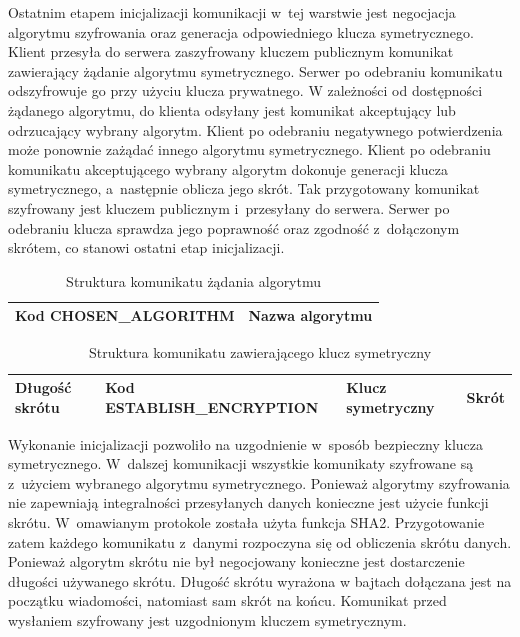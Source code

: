 Ostatnim etapem inicjalizacji komunikacji w~tej warstwie jest
negocjacja algorytmu szyfrowania oraz generacja odpowiedniego klucza
symetrycznego. Klient przesyła do serwera zaszyfrowany kluczem
publicznym komunikat zawierający żądanie algorytmu
symetrycznego. Serwer po odebraniu komunikatu odszyfrowuje go przy
użyciu klucza prywatnego. W zależności od dostępności żądanego
algorytmu, do klienta odsyłany jest komunikat akceptujący lub
odrzucający wybrany algorytm. Klient po odebraniu negatywnego
potwierdzenia może ponownie zażądać innego algorytmu
symetrycznego. Klient po odebraniu komunikatu akceptującego wybrany
algorytm dokonuje generacji klucza symetrycznego, a~następnie oblicza
jego skrót. Tak przygotowany komunikat szyfrowany jest kluczem
publicznym i~przesyłany do serwera. Serwer po odebraniu klucza
sprawdza jego poprawność oraz zgodność z~dołączonym skrótem, co
stanowi ostatni etap inicjalizacji.

\begin{table}[H]
\centering
\caption{Struktura komunikatu żądania algorytmu }

\begin{tabular}{|p{5cm}|p{6cm}|}
\hline
\raggedright{Kod CHOSEN\_ALGORITHM} & Nazwa algorytmu\\
\hline
\end{tabular}
\end{table}

\begin{table}[H]
\centering
\caption{Struktura komunikatu zawierającego klucz symetryczny}

\begin{tabular}{|p{3cm}|p{5cm}|p{3cm}|p{2cm}|}
\hline
Długość skrótu & \raggedright{Kod ESTABLISH\_ENCRYPTION} & \raggedright{Klucz symetryczny} & Skrót \\
\hline
\end{tabular}
\end{table}

Wykonanie inicjalizacji pozwoliło na uzgodnienie w~sposób bezpieczny
klucza symetrycznego. W~dalszej komunikacji wszystkie komunikaty
szyfrowane są z~użyciem wybranego algorytmu symetrycznego. Ponieważ
algorytmy szyfrowania nie zapewniają integralności przesyłanych danych
konieczne jest użycie funkcji skrótu. W~omawianym protokole została
użyta funkcja SHA2. Przygotowanie zatem każdego komunikatu z~danymi
rozpoczyna się od obliczenia skrótu danych. Ponieważ algorytm skrótu
nie był negocjowany konieczne jest dostarczenie długości używanego
skrótu. Długość skrótu wyrażona w bajtach dołączana jest na początku
wiadomości, natomiast sam skrót na końcu. Komunikat przed wysłaniem
szyfrowany jest uzgodnionym kluczem symetrycznym.

